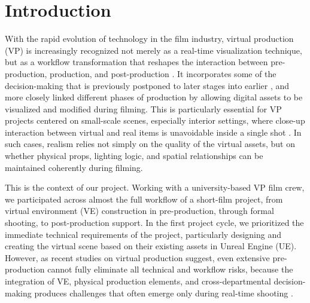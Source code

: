 \documentclass[conference]{IEEEtran}
\begin{document}
\begin{IEEEkeywords}
[placeholder]
\end{IEEEkeywords}

\section{Introduction}
With the rapid evolution of technology in the film industry, virtual production (VP) is increasingly recognized not merely as a real-time visualization technique, but as a workflow transformation that reshapes the interaction between pre-production, production, and post-production \cite{Swords2024it} \cite{SilvaJasaui2024}. It incorporates some of the decision-making that is previously postponed to later stages into earlier \cite{Swords2024agenda}, and more closely linked different phases of production by allowing digital assets to be visualized and modified during filming. This is particularly essential for VP projects centered on small-scale scenes, especially interior settings, where close-up interaction between virtual and real items is unavoidable inside a single shot \cite{Lam2025}. In such cases, realism relies not simply on the quality of the virtual assets, but on whether physical props, lighting logic, and spatial relationships can be maintained coherently during filming.

This is the context of our project. Working with a university-based VP film crew, we participated across almost the full workflow of a short-film project, from virtual environment (VE) construction in pre-production, through formal shooting, to post-production support. In the first project cycle, we prioritized the immediate technical requirements of the project, particularly designing and creating the virtual scene based on their existing assets in Unreal Engine (UE). However, as recent studies on virtual production suggest, even extensive pre-production cannot fully eliminate all technical and workflow risks, because the integration of VE, physical production elements, and cross-departmental decision-making produces challenges that often emerge only during real-time shooting \cite{Swords2024it} \cite{willment2024skills}.
\end{document}
